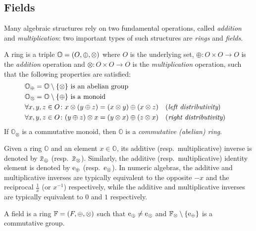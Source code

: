 \subsection{Fields}
Many algebraic structures rely on two fundamental operations, called \emph{addition} and 
\emph{multiplication}: two important types of such structures are \emph{rings} and \emph{fields}.
\begin{definition}[Ring]
  A ring is a triple \(\mathbb{O} = \left(O, \oplus, \otimes\right)\) where \(O\) is the 
  underlying set, \(\oplus\colon O \times O \to O\) is the \emph{addition} operation and 
  \(\otimes\colon O \times O \to O\) is the \emph{multiplication} operation, such that the 
  following properties are satisfied:
  \begin{align*}
    & \mathbb{O}_{\oplus} = \mathbb{O} \setminus \Set{\otimes}
      \textnormal{ is an abelian group} \\
    & \mathbb{O}_{\otimes} = \mathbb{O} \setminus \Set{\oplus} 
      \textnormal{ is a monoid} \\
    & \forall x,y,z \in O\colon x \otimes \Parens*{y \oplus z} = 
      \Parens*{x \otimes y} \oplus \Parens*{x \otimes z} && (\emph{left distributivity})\\
    & \forall x,y,z \in O\colon \Parens*{y \oplus z} \otimes x = 
      \Parens*{y \otimes x} \oplus \Parens*{z \otimes x} && (\emph{right distributivity})
  \end{align*}
  If \(\mathbb{O}_{\otimes}\) is a commutative monoid, then \(\mathbb{O}\) is a 
  \emph{commutative (abelian) ring}.
\end{definition}

Given a ring \(\mathbb{O}\) and an element \(x \in \mathbb{O}\), its additive 
(resp.\ multiplicative) inverse is denoted by \(\inv{x}_{\oplus}\) (resp.\  \(\inv{x}_{\otimes}\)).
Similarly, the additive (resp.\ multiplicative) identity element is denoted by 
\(\mathrm{e}_{\oplus}\) (resp.\  \(\mathrm{e}_{\otimes}\)).
In numeric algebras, the additive and multiplicative inverses are typically equivalent to the 
opposite \(-x\) and the reciprocal \(\frac{1}{x}\) (or \(x^{-1}\)) respectively, while the additive 
and multiplicative inverses are typically equivalent to \(0\) and \(1\) respectively.

\begin{definition}[Field]
  A field is a ring \(\mathbb{F} = \left(F, \oplus, \otimes\right)\) such that 
  \(\mathrm{e}_{\oplus} \neq \mathrm{e}_{\otimes}\) and \(\mathbb{F}_{\otimes} \setminus \left\{\mathrm{e}_{\oplus}\right\}\) 
  is a commutative group.
\end{definition}

